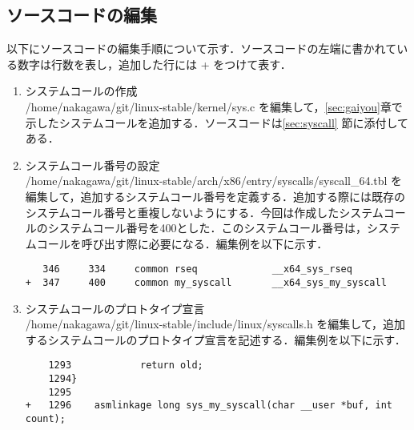 \documentclass[12pt]{jsarticle}
\begin{document}
\subsection{ソースコードの編集}\label{sec:hensyuu}
以下にソースコードの編集手順について示す．ソースコードの左端に書かれている数字は行数を表し，追加した行には + をつけて表す．
  \begin{enumerate}
  \item システムコールの作成\\    
    /home/nakagawa/git/linux-stable/kernel/sys.c を編集して，\ref{sec:gaiyou}章で示したシステムコールを追加する．ソースコードは\ref{sec:syscall} 節に添付してある．
  \item システムコール番号の設定\\
    /home/nakagawa/git/linux-stable/arch/x86/entry/syscalls/syscall\_64.tbl を編集して，追加するシステムコール番号を定義する．追加する際には既存のシステムコール番号と重複しないようにする．今回は作成したシステムコールのシステムコール番号を400とした．このシステムコール番号は，システムコールを呼び出す際に必要になる．編集例を以下に示す．
    
\begin{verbatim}
   346     334     common rseq             __x64_sys_rseq
+  347     400     common my_syscall       __x64_sys_my_syscall
\end{verbatim}

\item システムコールのプロトタイプ宣言\\  
  /home/nakagawa/git/linux-stable/include/linux/syscalls.h を編集して，追加するシステムコールのプロトタイプ宣言を記述する．編集例を以下に示す．
\begin{verbatim}
    1293            return old;
    1294} 
    1295
+   1296    asmlinkage long sys_my_syscall(char __user *buf, int count);
\end{verbatim}
  \end{enumerate}
  
\end{document}
